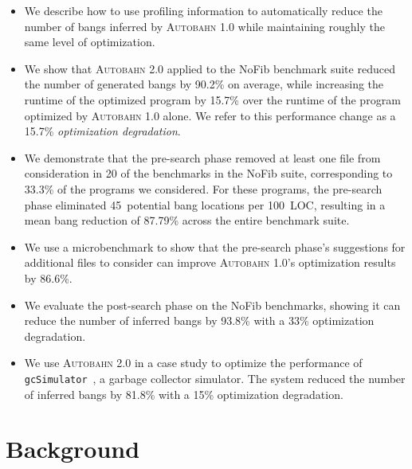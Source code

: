 \documentclass[format=sigplan, review=true, 9pt]{acmart}
\newcommand{\cut}[1]{}
\newcommand{\acut}[1]{}
\newcommand{\Ao}[0]{\textsc{Autobahn 1.0}}
\newcommand{\At}[0]{\textsc{Autobahn 2.0}}
\newcommand{\preopt}[0]{pre-search}
\newcommand{\postopt}[0]{post-search}
\begin{document}
\begin{itemize}
  \item We describe how to use profiling information to automatically reduce the number
    of bangs inferred by \Ao{} while maintaining roughly the same
    level of optimization.
  \item We show that \At{} applied to the NoFib benchmark suite reduced
    the number of generated bangs by 90.2\% on average, while
    increasing the runtime of the optimized program by 15.7\% over the
    runtime of the program optimized by \Ao{} alone. We refer to this
    performance change as a 15.7\% \textit{optimization degradation}.
\cut{(2.0 runtime - 1.0 runtime)/original}
  \item We demonstrate that the \preopt{} phase removed at least
    one file from consideration in 20 of the benchmarks in the NoFib
    suite, corresponding to 33.3\% of the programs we considered.
    For these programs, the \preopt{} phase eliminated
    45~potential bang locations per 100~LOC, resulting in a mean bang
    reduction of 87.79\% across the entire benchmark suite. 
  \item We use a microbenchmark to show that the \preopt{} phase's
    suggestions for additional files to consider can improve \Ao{}'s
    optimization results by 86.6\%.
  \item We evaluate the \postopt{} phase on the NoFib benchmarks,
    showing it can reduce the number of inferred bangs by
    93.8\% with a 33\% optimization degradation.
  \item We use \At{} in a case study to optimize the performance of 
    \texttt{gcSimulator}~\cite{Ricci13}, a garbage collector
    simulator. The system reduced the number of inferred bangs by
    81.8\% with a 15\% optimization degradation.
\acut{
  \item We apply \At{} in a second case study to show that it can
    preserve the application-specific annotations inferred by \Ao{}
    for two different uses of the Aeson~\cite{aeson} library.}
\end{itemize}


\section{Background}
\end{document}
